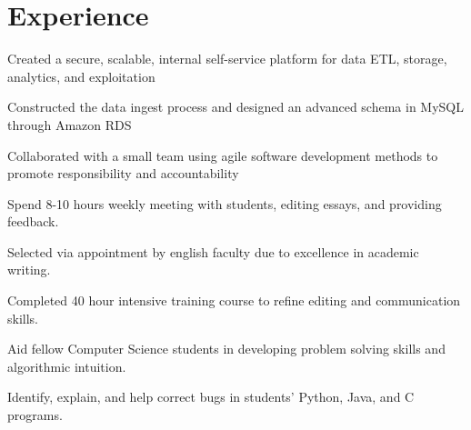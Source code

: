 \documentclass{resume}
\begin{document}
\hfill
\begin{minipage}[t]{0.66\textwidth}


\section{Experience}

\vspace{1.25\topsep} %
\begin{tightemize}
\item Created a secure, scalable, internal self-service platform for data ETL, storage, analytics, and exploitation
\item Constructed the data ingest process and designed an advanced schema in MySQL through Amazon RDS
\item Collaborated with a small team using agile software development methods to promote responsibility and accountability
\end{tightemize}
\sectionsep

\begin{tightemize}
\item Spend 8-10 hours weekly meeting with students, editing essays, and providing feedback. 
\item Selected via appointment by english faculty due to excellence in academic writing.
\item Completed 40 hour intensive training course to refine editing  and communication skills.
\end{tightemize}
\sectionsep

\begin{tightemize}
\item Aid fellow Computer Science students in developing problem solving skills and algorithmic intuition.
\item Identify, explain, and help correct bugs in students’ Python, Java, and C programs.
\end{tightemize}
\sectionsep



\end{minipage}
\end{document}
